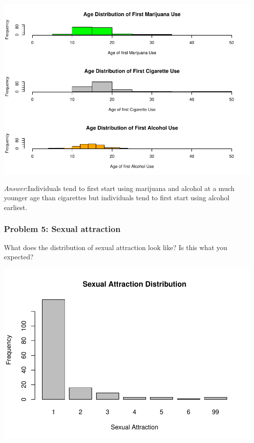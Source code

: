 \documentclass[
]{article}
\newenvironment{Shaded}{\begin{snugshade}}{\end{snugshade}}
\newcommand{\AttributeTok}[1]{\textcolor[rgb]{0.77,0.63,0.00}{#1}}
\newcommand{\FunctionTok}[1]{\textcolor[rgb]{0.00,0.00,0.00}{#1}}
\newcommand{\NormalTok}[1]{#1}
\newcommand{\OtherTok}[1]{\textcolor[rgb]{0.56,0.35,0.01}{#1}}
\newcommand{\SpecialCharTok}[1]{\textcolor[rgb]{0.00,0.00,0.00}{#1}}
\newcommand{\StringTok}[1]{\textcolor[rgb]{0.31,0.60,0.02}{#1}}
\begin{document}
\includegraphics{Assignments_files/figure-latex/unnamed-chunk-12-1.pdf}

\emph{Answer}:Individuals tend to first start using marijuana and
alcohol at a much younger age than cigarettes but individuals tend to
first start using alcohol earliest.

\hypertarget{problem-5-sexual-attraction}{%
\subsubsection{Problem 5: Sexual
attraction}\label{problem-5-sexual-attraction}}

What does the distribution of sexual attraction look like? Is this what
you expected?

\begin{Shaded}
\end{Shaded}

\includegraphics{Assignments_files/figure-latex/unnamed-chunk-13-1.pdf}
\end{document}

